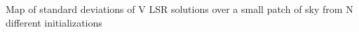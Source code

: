 \label{fig:initialization_effects} Map of standard deviations of V LSR solutions over a small patch of sky from N different initializations
